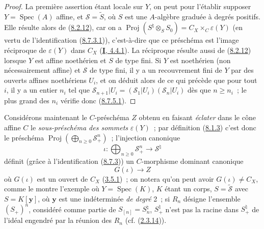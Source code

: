 \begin{proof}
La première assertion étant locale sur $Y$, on peut pour l'établir supposer
$Y=\operatorname{Spec}(A)$ affine, et $\mathcal{S}=\widetilde{S}$, où $S$ est
une $A$-algèbre graduée à degrés positifs. Elle résulte alors de
(\hyperref[II.8.2.12-fr]{8.2.12}), car on a
$\operatorname{Proj}(S^{\natural}\otimes_S S_0)=
C_X\times_C\varepsilon(Y)$ (en vertu de l'identification
(\hyperref[II.8.7.3.1-fr]{8.7.3.1})), c'est-à-dire que ce préschéma est
l'image réciproque de $\varepsilon(Y)$ dans $C_X$
(\hyperref[I.4.4.1-fr]{\textbf{I}, 4.4.1}). La réciproque résulte aussi de
(\hyperref[II.8.2.12-fr]{8.2.12}) lorsque $Y$ est affine noethérien et $S$ de
type fini.
Si $Y$ est noethérien (non nécessairement affine) et $\mathcal{S}$ de type
fini, il y a un recouvrement fini de $Y$ par des ouverts affines noethériens
$U_i$, et on déduit alors de ce qui précède que pour tout $i$, il y a un
entier $n_i$ tel que
$\mathcal{S}_{n+1}|U_i=(\mathcal{S}_1|U_i)(\mathcal{S}_n|U_i)$ dès que
$n\geqslant n_i$~; le plus grand des $n_i$ vérifie donc
(\hyperref[II.8.7.5.1-fr]{8.7.5.1}).
\end{proof}

\begin{env}[8.7.6]
\label{II.8.7.6-fr}
Considérons maintenant le $C$-préschéma $Z$ obtenu en faisant \emph{éclater}
dans le cône affine $C$ le \emph{sous-préschéma des sommets}
$\varepsilon(Y)$~; par définition (\hyperref[II.8.1.3-fr]{8.1.3}) c'est donc
le préschéma
$\operatorname{Proj}(\bigoplus_{n\geqslant 0}\mathcal{S}_+^n)$~; l'injection
canonique
\begin{equation}
\label{II.8.7.6.1-fr}
  \iota:\bigoplus_{n\geqslant 0}\mathcal{S}_+^n
  \longrightarrow\mathcal{S}^{\natural}
\tag{8.7.6.1}
\end{equation}
définit (grâce à l'identification (\hyperref[II.8.7.3-fr]{8.7.3})) un
$C$-morphisme dominant canonique
\begin{equation}
\label{II.8.7.6.2-fr}
  G(\iota)\longrightarrow Z
\tag{8.7.6.2}
\end{equation}
où $G(\iota)$ est un ouvert de $C_X$ (\hyperref[II.3.5.1-fr]{3.5.1})~; on
notera qu'on peut avoir $G(\iota)\ne C_X$, comme le montre l'exemple où
$Y=\operatorname{Spec}(K)$, $K$ étant un corps, $S=\widetilde{\mathcal{S}}$
avec $S=K[\mathbf{y}]$, où $\mathbf{y}$ est une indéterminée \emph{de degré}
2~; si $R_n$ désigne l'ensemble $(S_+)^n$, considéré comme partie de
$S_{[n]}=S_n^{\natural}$, $S_+^{\natural}$ n'est pas la racine dans
$S_+^{\natural}$ de l'idéal engendré par la réunion des $R_n$ (cf.
(\hyperref[II.2.3.14-fr]{2.3.14})).
\end{env}

